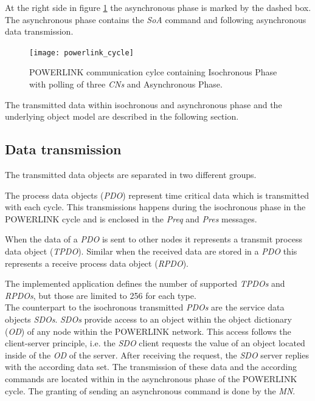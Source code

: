 At the right side in figure \ref{fig:powerlink_cycle} the asynchronous phase is marked by the dashed box.
The asynchronous phase contains the \emph{SoA} command  and following asynchronous data transmission.

\begin{figure}
    \centering
    \texttt{[image: powerlink\_cycle]}
    \caption{POWERLINK communication cylce containing Isochronous Phase with polling of three \emph{CNs} and Asynchronous Phase.}
    \label{fig:powerlink_cycle}
\end{figure}

The transmitted data within isochronous and asynchronous phase and the underlying object model are described in the following section.

\subsection{Data transmission}
\label{sec:oplk_powerlink_data_transmission}
The transmitted data objects are separated in two different groups.

The process data objects (\emph{PDO}) represent time critical data which is transmitted with each cycle.
This transmissions happens during the isochronous phase in the POWERLINK cycle and is enclosed in the \emph{Preq} and \emph{Pres} messages.

When the data of a \emph{PDO} is sent to other nodes it represents a transmit process data object (\emph{TPDO}).
Similar when the received data are stored in a \emph{PDO} this represents a receive process data object (\emph{RPDO}).

The implemented application defines the number of supported \emph{TPDOs} and \emph{RPDOs}, but those are limited to 256 for each type. \cite[section 6.4]{epsg_epsg_2013}
\\

The counterpart to the isochronous transmitted \emph{PDOs} are the service data objects \emph{SDOs}.
\emph{SDOs} provide access to an object within the object dictionary (\emph{OD}) of any node within the POWERLINK network.
This access follows the client-server principle, i.e. the \emph{SDO} client requests the value of an object located inside of the  \emph{OD} of the server.
After receiving the request, the \emph{SDO} server replies with the according data set.
The transmission of these data and the according commands are located within in the asynchronous phase of the POWERLINK cycle.
The granting of sending an asynchronous command is done by the \emph{MN}.

